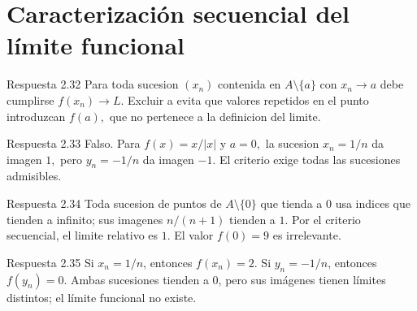 \documentclass[10pt,a4paper,oneside,openany]{book}
\begin{document}
\section{Caracterización secuencial del límite funcional}
\begin{PSevenAnswerFixed}{Respuesta 2.32}
Para toda sucesion \((x_n)\) contenida en \(A\setminus \{a\}\) con \(x_n\to a\) debe cumplirse \(f(x_n)\to L\). Excluir a evita que valores repetidos en el punto introduzcan \(f(a),\) que no pertenece a la definicion del limite.
\end{PSevenAnswerFixed}
\begin{PSevenAnswerFixed}{Respuesta 2.33}
Falso. Para \(f(x)=x/|x|\) y \(a=0,\) la sucesion \(x_n=1/n\) da imagen \(1,\) pero \(y_n=-1/n\) da imagen \(-1\). El criterio exige todas las sucesiones admisibles.
\end{PSevenAnswerFixed}
\begin{PSevenAnswerFixed}{Respuesta 2.34}
Toda sucesion de puntos de \(A\setminus \{0\}\) que tienda a \(0\) usa indices que tienden a infinito; sus imagenes \(n/(n+1)\) tienden a \(1\). Por el criterio secuencial, el limite relativo es \(1\). El valor \(f(0)=9\) es irrelevante.
\end{PSevenAnswerFixed}
\begin{PSevenAnswerFixed}{Respuesta 2.35}
Si \(x_n=1/n\), entonces \(f(x_n)=2\). Si \(y_n=-1/n\), entonces \(f(y_n)=0\). Ambas sucesiones tienden a \(0\), pero sus imágenes tienen límites distintos; el límite funcional no existe.
\end{PSevenAnswerFixed}
\end{document}
